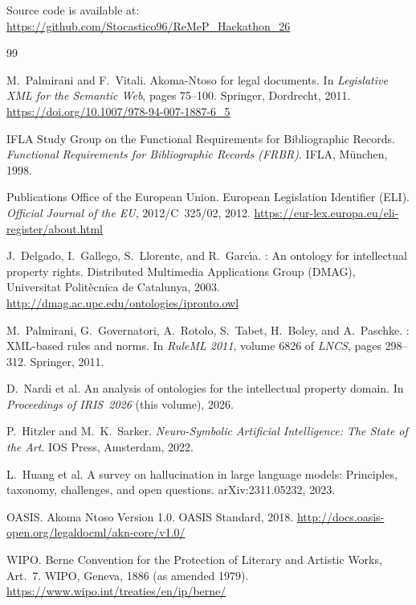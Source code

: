 \documentclass[12pt,a4paper]{article}
\begin{document}
Source code is available at:
\url{https://github.com/Stocastico96/ReMeP_Hackathon_26}

\begin{thebibliography}{99}

M.~Palmirani and F.~Vitali.
\newblock Akoma-Ntoso for legal documents.
\newblock In \emph{Legislative XML for the Semantic Web}, pages 75--100.
  Springer, Dordrecht, 2011.
\newblock \url{https://doi.org/10.1007/978-94-007-1887-6_5}

IFLA Study Group on the Functional Requirements for Bibliographic Records.
\newblock \emph{Functional Requirements for Bibliographic Records (FRBR)}.
\newblock IFLA, M\"{u}nchen, 1998.

Publications Office of the European Union.
\newblock European Legislation Identifier (ELI).
\newblock \emph{Official Journal of the EU}, 2012/C~325/02, 2012.
\newblock \url{https://eur-lex.europa.eu/eli-register/about.html}

J.~Delgado, I.~Gallego, S.~Llorente, and R.~Garc\'{\i}a.
: An ontology for intellectual property rights.
\newblock Distributed Multimedia Applications Group (DMAG), Universitat
  Polit\`{e}cnica de Catalunya, 2003.
\newblock \url{http://dmag.ac.upc.edu/ontologies/ipronto.owl}

M.~Palmirani, G.~Governatori, A.~Rotolo, S.~Tabet, H.~Boley, and A.~Paschke.
: {XML}-based rules and norms.
\newblock In \emph{RuleML 2011}, volume 6826 of \emph{LNCS}, pages 298--312.
  Springer, 2011.

D.~Nardi et al.
\newblock An analysis of ontologies for the intellectual property domain.
\newblock In \emph{Proceedings of IRIS~2026} (this volume), 2026.

P.~Hitzler and M.~K.~Sarker.
\newblock \emph{Neuro-Symbolic Artificial Intelligence: The State of the Art}.
\newblock IOS Press, Amsterdam, 2022.

L.~Huang et al.
\newblock A survey on hallucination in large language models: Principles,
  taxonomy, challenges, and open questions.
\newblock arXiv:2311.05232, 2023.

OASIS.
\newblock Akoma Ntoso Version 1.0.
\newblock OASIS Standard, 2018.
\newblock \url{http://docs.oasis-open.org/legaldocml/akn-core/v1.0/}

WIPO.
\newblock Berne Convention for the Protection of Literary and Artistic Works,
  Art.~7.
\newblock WIPO, Geneva, 1886 (as amended 1979).
\newblock \url{https://www.wipo.int/treaties/en/ip/berne/}

\end{thebibliography}
\end{document}
